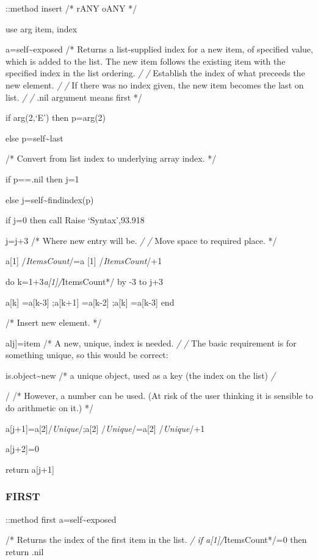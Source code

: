 ::method insert /* rANY oANY */

use arg item, index

a=self\textasciitilde exposed /* Returns a list-supplied index for a new
item, of specified value, which is added to the list. The new item
follows the existing item with the specified index in the list ordering.
\emph{/ /} Establish the index of what preceeds the new element. \emph{/
/} If there was no index given, the new item becomes the last on list.
\emph{/ /} .nil argument means first */

if arg(2,`E') then p=arg(2)

else p=self\textasciitilde last

/* Convert from list index to underlying array index. */

if p==.nil then j=1

else j=self\textasciitilde findindex(p)

if j=0 then call Raise `Syntax',93.918

j=j+3 /* Where new entry will be. \emph{/ /} Move space to required
place. */

a{[}1{]} /\emph{ItemsCount}/=a {[}1{]} /\emph{ItemsCount}/+1

do k=1+3\emph{a{[}1{]}/}ItemsCount*/ by -3 to j+3

a{[}k{]} =a{[}k-3{]} ;a{[}k+1{]} =a{[}k-2{]} ;a{[}k{]} =a{[}k-3{]} end

/* Insert new element. */

alj{]}=item /* A new, unique, index is needed. \emph{/ /} The basic
requirement is for something unique, so this would be correct:

is.object\textasciitilde new /* a unique object, used as a key (the
index on the list) \emph{/ }

/ /* However, a number can be used. (At risk of the user thinking it is
sensible to do arithmetic on it.) */

a{[}j+1{]}=a{[}2{]}/\emph{Unique}/;a{[}2{]} /\emph{Unique}/=a{[}2{]}
/\emph{Unique}/+1

a{[}j+2{]}=0

return a{[}j+1{]}

\subsubsection{FIRST}\label{first}

::method first a=self\textasciitilde exposed

/* Returns the index of the first item in the list. \emph{/ if
a{[}1{]}/}ItemsCount*/=0 then return .nil


